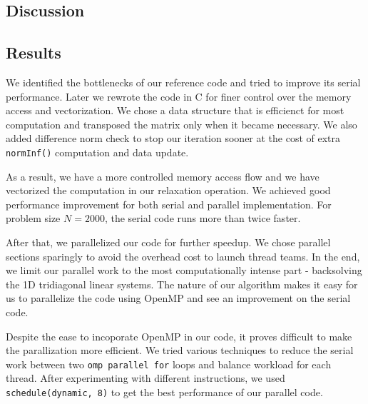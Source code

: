 \documentclass[a4paper,11pt]{article}
\begin{document}
	\begin{multicols}{2}
\section{Discussion}
	\subsection{Results}
	We identified the bottlenecks of our reference code and tried to improve its serial performance. Later we rewrote the code in C for finer control over the memory access and vectorization. We chose a data structure that is efficienct for most computation and transposed the matrix only when it became necessary. We also added difference norm check to stop our iteration sooner at the cost of extra \verb|normInf()| computation and data update.
	\par As a result, we have a more controlled memory access flow and we have vectorized the computation in our relaxation operation. We achieved good performance improvement for both serial and parallel implementation. For problem size $N = 2000$, the serial code runs more than twice faster.
	\par After that, we parallelized our code for further speedup. We chose parallel sections sparingly to avoid the overhead cost to launch thread teams. In the end, we limit our parallel work to the most computationally intense part - backsolving the 1D tridiagonal linear systems. The nature of our algorithm makes it easy for us to parallelize the code using OpenMP and see an improvement on the serial code.
	\par Despite the ease to incoporate OpenMP in our code, it proves difficult to make the parallization more efficient. We tried various techniques to reduce the serial work between two \verb|omp parallel for| loops and balance workload for each thread. After experimenting with different instructions, we used \verb|schedule(dynamic, 8)| to get the best performance of our parallel code.

\end{multicols}
\end{document}
